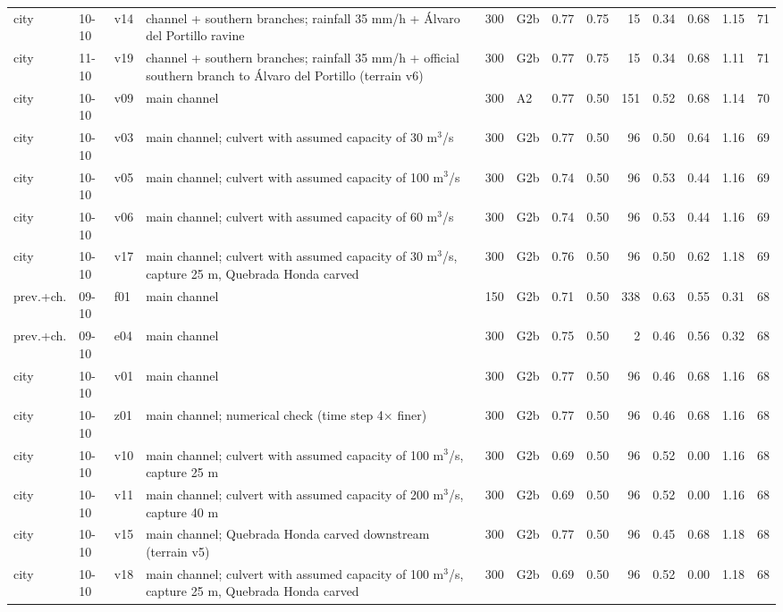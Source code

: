 {\begin{longtable}{lll>{\raggedright\arraybackslash}p{3.3cm}rlrrrrrrr}
city & 10-10 & v14 & channel + southern branches; rainfall 35 mm/h + Álvaro del Portillo ravine & 300 & G2b & 0.77 & 0.75 & 15 & 0.34 & 0.68 & 1.15 & 71\\
city & 11-10 & v19 & channel + southern branches; rainfall 35 mm/h + official southern branch to Álvaro del Portillo (terrain v6) & 300 & G2b & 0.77 & 0.75 & 15 & 0.34 & 0.68 & 1.11 & 71\\
city & 10-10 & v09 & main channel & 300 & A2 & 0.77 & 0.50 & 151 & 0.52 & 0.68 & 1.14 & 70\\
city & 10-10 & v03 & main channel; culvert with assumed capacity of 30 m$^3$/s & 300 & G2b & 0.77 & 0.50 & 96 & 0.50 & 0.64 & 1.16 & 69\\
city & 10-10 & v05 & main channel; culvert with assumed capacity of 100 m$^3$/s & 300 & G2b & 0.74 & 0.50 & 96 & 0.53 & 0.44 & 1.16 & 69\\
city & 10-10 & v06 & main channel; culvert with assumed capacity of 60 m$^3$/s & 300 & G2b & 0.74 & 0.50 & 96 & 0.53 & 0.44 & 1.16 & 69\\
city & 10-10 & v17 & main channel; culvert with assumed capacity of 30 m$^3$/s, capture 25 m, Quebrada Honda carved & 300 & G2b & 0.76 & 0.50 & 96 & 0.50 & 0.62 & 1.18 & 69\\
prev.+ch. & 09-10 & f01 & main channel & 150 & G2b & 0.71 & 0.50 & 338 & 0.63 & 0.55 & 0.31 & 68\\
prev.+ch. & 09-10 & e04 & main channel & 300 & G2b & 0.75 & 0.50 & 2 & 0.46 & 0.56 & 0.32 & 68\\
city & 10-10 & v01 & main channel & 300 & G2b & 0.77 & 0.50 & 96 & 0.46 & 0.68 & 1.16 & 68\\
city & 10-10 & z01 & main channel; numerical check (time step 4× finer) & 300 & G2b & 0.77 & 0.50 & 96 & 0.46 & 0.68 & 1.16 & 68\\
city & 10-10 & v10 & main channel; culvert with assumed capacity of 100 m$^3$/s, capture 25 m & 300 & G2b & 0.69 & 0.50 & 96 & 0.52 & 0.00 & 1.16 & 68\\
city & 10-10 & v11 & main channel; culvert with assumed capacity of 200 m$^3$/s, capture 40 m & 300 & G2b & 0.69 & 0.50 & 96 & 0.52 & 0.00 & 1.16 & 68\\
city & 10-10 & v15 & main channel; Quebrada Honda carved downstream (terrain v5) & 300 & G2b & 0.77 & 0.50 & 96 & 0.45 & 0.68 & 1.18 & 68\\
city & 10-10 & v18 & main channel; culvert with assumed capacity of 100 m$^3$/s, capture 25 m, Quebrada Honda carved & 300 & G2b & 0.69 & 0.50 & 96 & 0.52 & 0.00 & 1.18 & 68\\

\end{longtable}}
